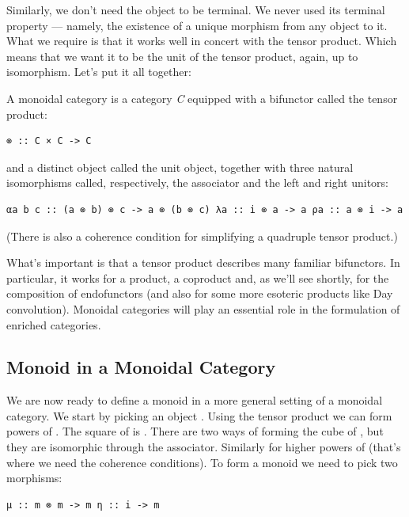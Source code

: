 Similarly, we don't need the object  to be terminal. We never
used its terminal property --- namely, the existence of a unique
morphism from any object to it. What we require is that it works well in
concert with the tensor product. Which means that we want it to be the
unit of the tensor product, again, up to isomorphism. Let's put it all
together:

A monoidal category is a category \emph{C} equipped with a bifunctor
called the tensor product:

\begin{verbatim}
⊗ :: C × C -> C
\end{verbatim}

and a distinct object  called the unit object, together with
three natural isomorphisms called, respectively, the associator and the
left and right unitors:

\begin{verbatim}
αa b c :: (a ⊗ b) ⊗ c -> a ⊗ (b ⊗ c) λa :: i ⊗ a -> a ρa :: a ⊗ i -> a
\end{verbatim}

(There is also a coherence condition for simplifying a quadruple tensor
product.)

What's important is that a tensor product describes many familiar
bifunctors. In particular, it works for a product, a coproduct and, as
we'll see shortly, for the composition of endofunctors (and also for
some more esoteric products like Day convolution). Monoidal categories
will play an essential role in the formulation of enriched categories.

\subsection{Monoid in a Monoidal
Category}\label{monoid-in-a-monoidal-category}

We are now ready to define a monoid in a more general setting of a
monoidal category. We start by picking an object . Using the
tensor product we can form powers of . The square of
 is . There are two ways of forming the cube
of , but they are isomorphic through the associator. Similarly
for higher powers of  (that's where we need the coherence
conditions). To form a monoid we need to pick two morphisms:

\begin{verbatim}
μ :: m ⊗ m -> m η :: i -> m
\end{verbatim}

